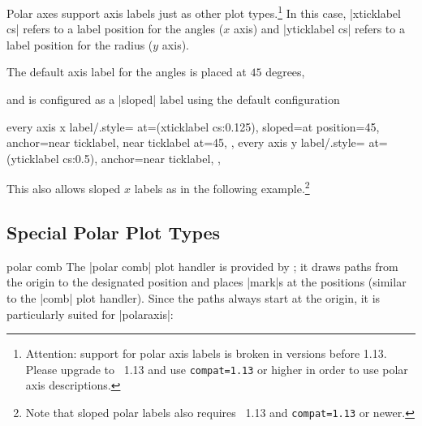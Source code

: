 {Polar axes support axis labels just as other plot types.\footnote{Attention: support for polar axis labels is broken in versions before 1.13. Please upgrade to \PGFPlots\ 1.13 and use \texttt{compat=1.13} or higher in order to use polar axis descriptions.} In this case, |xticklabel cs| refers to a label position for the angles ($x$ axis) and |yticklabel cs| refers to a label position for the radius ($y$ axis).

The default axis label for the angles is placed at $45$ degrees, 
\begin{codeexample}[]
\end{codeexample}
and is configured as a |sloped| label using the default configuration
\begin{codeexample}
	every axis x label/.style={
		at={(xticklabel cs:0.125)},
		sloped={at position=45},
		anchor=near ticklabel,
		near ticklabel at=45,
	},
	every axis y label/.style={
		at={(yticklabel cs:0.5)},
		anchor=near ticklabel,
	},
\end{codeexample}

This also allows sloped $x$ labels as in the following example.\footnote{Note that sloped polar labels also requires \PGFPlots\ 1.13 and \texttt{compat=1.13} or newer.}
\begin{codeexample}[]
\end{codeexample}


\subsection{Special Polar Plot Types}
\begin{plottype}{polar comb}
	The |polar comb| plot handler is provided by \Tikz; it draws paths from the origin to the designated position and places |mark|s at the positions (similar to the |comb| plot handler). Since the paths always start at the origin, it is particularly suited for |polaraxis|:
\begin{codeexample}[]
\end{codeexample}
\end{plottype}

}
